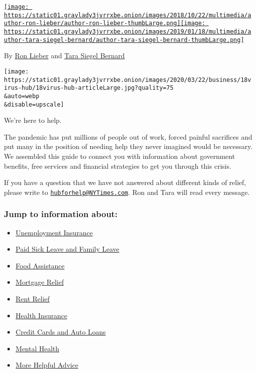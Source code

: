 \href{https://www.nytimes3xbfgragh.onion/by/ron-lieber}{\texttt{[image: https://static01.graylady3jvrrxbe.onion/images/2018/10/22/multimedia/author-ron-lieber/author-ron-lieber-thumbLarge.png]}}\href{https://www.nytimes3xbfgragh.onion/by/tara-siegel-bernard}{\texttt{[image: https://static01.graylady3jvrrxbe.onion/images/2019/01/18/multimedia/author-tara-siegel-bernard/author-tara-siegel-bernard-thumbLarge.png]}}

By \href{https://www.nytimes3xbfgragh.onion/by/ron-lieber}{Ron Lieber}
and
\href{https://www.nytimes3xbfgragh.onion/by/tara-siegel-bernard}{Tara
Siegel Bernard}

\texttt{[image: https://static01.graylady3jvrrxbe.onion/images/2020/03/22/business/18virus-hub/18virus-hub-articleLarge.jpg?quality=75\\\&auto=webp\\\&disable=upscale]}

We're here to help.

The pandemic has put millions of people out of work, forced painful
sacrifices and put many in the position of needing help they never
imagined would be necessary. We assembled this guide to connect you with
information about government benefits, free services and financial
strategies to get you through this crisis.

If you have a question that we have not answered about different kinds
of relief, please write to
\href{mailto:hubforhelp@NYTimes.com}{\nolinkurl{hubforhelp@NYTimes.com}}.
Ron and Tara will read every message.

\hypertarget{jump-to-information-about}{%
\subsubsection{Jump to information
about:}\label{jump-to-information-about}}

\begin{itemize}
\tightlist
\item
  \protect\hyperlink{link-2f8736c0}{Unemployment Insurance}
\item
  \protect\hyperlink{link-4ccc30a7}{Paid Sick Leave and Family Leave}
\item
  \protect\hyperlink{link-3c2140bc}{Food Assistance}
\item
  \protect\hyperlink{link-39bfe27a}{Mortgage Relief}
\item
  \protect\hyperlink{link-1da1a7c4}{Rent Relief}
\item
  \protect\hyperlink{link-74e96196}{Health Insurance}
\item
  \protect\hyperlink{link-75bcf9dc}{Credit Cards and Auto Loans}
\item
  \protect\hyperlink{link-49737032}{Mental Health}
\item
  \protect\hyperlink{link-16f012f2}{More Helpful Advice}
\end{itemize}

